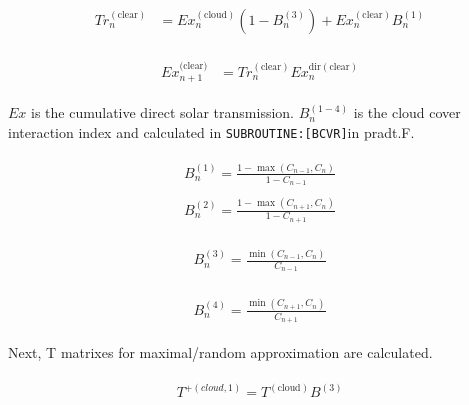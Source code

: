 \begin{eqnarray}
\begin{aligned}
T r_{n}^{(\text {clear})} &=E x_{n}^{(\text {cloud})}\left(1-B_{n}^{(3)}\right)+E x_{n}^{(\text {clear})} B_{n}^{(1)}
\end{aligned}
\end{eqnarray}

\begin{eqnarray}
\begin{aligned}
E x_{n+1}^{(\text {clear)} }&={Tr}_{n}^{(\text {clear})} E x_{n}^{\text {dir}(\text {clear})}
\end{aligned}
\end{eqnarray}

\(Ex\) is the cumulative direct solar transmission. \(B_{n}^{(1-4)}\) is the cloud cover interaction index and calculated in \texttt{SUBROUTINE:{[}BCVR{]}}in pradt.F.

\begin{eqnarray}
\begin{array}{l}
B_{n}^{(1)}=\frac{1-\max \left(C_{n-1}, C_{n}\right)}{1-C_{n-1}}
\end{array}
\end{eqnarray} \begin{eqnarray}
\begin{array}{l}
B_{n}^{(2)}=\frac{1-\max \left(C_{n+1}, C_{n}\right)}{1-C_{n+1}}
\end{array}
\end{eqnarray}

\begin{eqnarray}
\begin{array}{l}
B_{n}^{(3)}=\frac{\min \left(C_{n-1}, C_{n}\right)}{C_{n-1}}
\end{array}
\end{eqnarray}

\begin{eqnarray}
\begin{array}{l}
B_{n}^{(4)}=\frac{\min \left(C_{n+1}, C_{n}\right)}{C_{n+1}}
\end{array}
\end{eqnarray}

Next, T matrixes for maximal/random approximation are calculated.

\begin{eqnarray}
\begin{array}{l}
T^{+(cloud, 1)}=T^{(\text {cloud})} B^{(3)}
\end{array}
\end{eqnarray}

